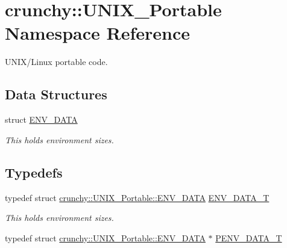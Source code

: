 \hypertarget{namespacecrunchy_1_1_u_n_i_x___portable}{}\section{crunchy\+:\+:U\+N\+I\+X\+\_\+\+Portable Namespace Reference}
\label{namespacecrunchy_1_1_u_n_i_x___portable}


U\+N\+I\+X/\+Linux portable code.  


\subsection*{Data Structures}
\begin{DoxyCompactItemize}
\item 
struct \hyperlink{structcrunchy_1_1_u_n_i_x___portable_1_1_e_n_v___d_a_t_a}{E\+N\+V\+\_\+\+D\+A\+TA}
\begin{DoxyCompactList}\small\item\em This holds environment sizes. \end{DoxyCompactList}\end{DoxyCompactItemize}
\subsection*{Typedefs}
\begin{DoxyCompactItemize}
\item 
typedef struct \hyperlink{structcrunchy_1_1_u_n_i_x___portable_1_1_e_n_v___d_a_t_a}{crunchy\+::\+U\+N\+I\+X\+\_\+\+Portable\+::\+E\+N\+V\+\_\+\+D\+A\+TA} \hyperlink{namespacecrunchy_1_1_u_n_i_x___portable_a200439e6a525bf357a766278278cda8f}{E\+N\+V\+\_\+\+D\+A\+T\+A\+\_\+T}
\begin{DoxyCompactList}\small\item\em This holds environment sizes. \end{DoxyCompactList}\item 
typedef struct \hyperlink{structcrunchy_1_1_u_n_i_x___portable_1_1_e_n_v___d_a_t_a}{crunchy\+::\+U\+N\+I\+X\+\_\+\+Portable\+::\+E\+N\+V\+\_\+\+D\+A\+TA} $\ast$ \hyperlink{namespacecrunchy_1_1_u_n_i_x___portable_a3e10341fe78682a3fd657e631e2659dc}{P\+E\+N\+V\+\_\+\+D\+A\+T\+A\+\_\+T}
\end{DoxyCompactItemize}
